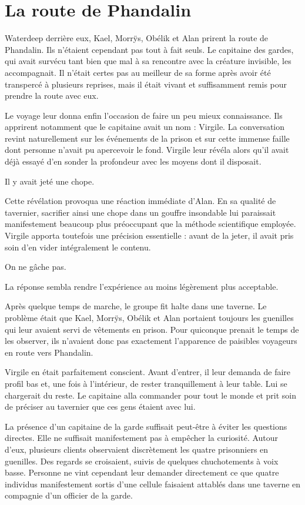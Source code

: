 \chapter{La route de Phandalin}

Waterdeep derrière eux, Kael, Morrÿs, Obélik et Alan prirent la route de Phandalin. Ils n'étaient cependant pas tout à fait seuls. Le capitaine des gardes, qui avait survécu tant bien que mal à sa rencontre avec la créature invisible, les accompagnait. Il n'était certes pas au meilleur de sa forme après avoir été transpercé à plusieurs reprises, mais il était vivant et suffisamment remis pour prendre la route avec eux.

Le voyage leur donna enfin l'occasion de faire un peu mieux connaissance. Ils apprirent notamment que le capitaine avait un nom : Virgile. La conversation revint naturellement sur les événements de la prison et sur cette immense faille dont personne n'avait pu apercevoir le fond. Virgile leur révéla alors qu'il avait déjà essayé d'en sonder la profondeur avec les moyens dont il disposait.

Il y avait jeté une chope.

Cette révélation provoqua une réaction immédiate d'Alan. En sa qualité de tavernier, sacrifier ainsi une chope dans un gouffre insondable lui paraissait manifestement beaucoup plus préoccupant que la méthode scientifique employée. Virgile apporta toutefois une précision essentielle : avant de la jeter, il avait pris soin d'en vider intégralement le contenu.

On ne gâche pas.

La réponse sembla rendre l'expérience au moins légèrement plus acceptable.

\scenebreak

Après quelque temps de marche, le groupe fit halte dans une taverne. Le problème était que Kael, Morrÿs, Obélik et Alan portaient toujours les guenilles qui leur avaient servi de vêtements en prison. Pour quiconque prenait le temps de les observer, ils n'avaient donc pas exactement l'apparence de paisibles voyageurs en route vers Phandalin.

Virgile en était parfaitement conscient. Avant d'entrer, il leur demanda de faire profil bas et, une fois à l'intérieur, de rester tranquillement à leur table. Lui se chargerait du reste. Le capitaine alla commander pour tout le monde et prit soin de préciser au tavernier que ces gens étaient avec lui.

La présence d'un capitaine de la garde suffisait peut-être à éviter les questions directes. Elle ne suffisait manifestement pas à empêcher la curiosité. Autour d'eux, plusieurs clients observaient discrètement les quatre prisonniers en guenilles. Des regards se croisaient, suivis de quelques chuchotements à voix basse. Personne ne vint cependant leur demander directement ce que quatre individus manifestement sortis d'une cellule faisaient attablés dans une taverne en compagnie d'un officier de la garde.

